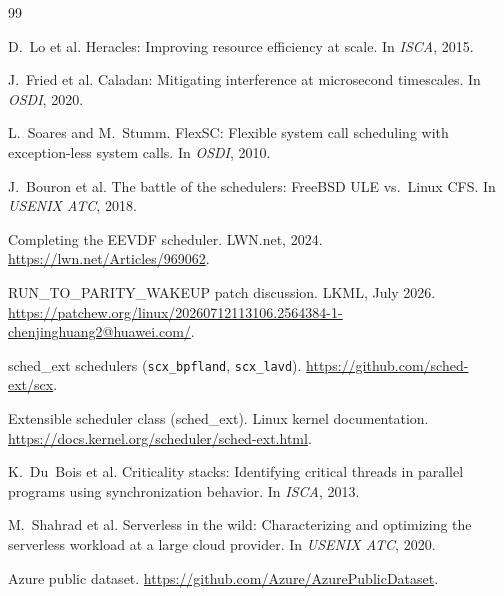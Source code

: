 \documentclass[letterpaper,twocolumn,10pt]{article}
\begin{document}
{\footnotesize
\begin{thebibliography}{99}
\setlength{\itemsep}{0pt}

D.~Lo et al.
\newblock Heracles: Improving resource efficiency at scale.
\newblock In {\em ISCA}, 2015.

J.~Fried et al.
\newblock Caladan: Mitigating interference at microsecond timescales.
\newblock In {\em OSDI}, 2020.

L.~Soares and M.~Stumm.
\newblock FlexSC: Flexible system call scheduling with exception-less system
  calls.
\newblock In {\em OSDI}, 2010.

J.~Bouron et al.
\newblock The battle of the schedulers: FreeBSD ULE vs.\ Linux CFS.
\newblock In {\em USENIX ATC}, 2018.

Completing the EEVDF scheduler.
\newblock LWN.net, 2024. \url{https://lwn.net/Articles/969062}.

RUN\_TO\_PARITY\_WAKEUP patch discussion.
\newblock LKML, July 2026.
\newblock
  \url{https://patchew.org/linux/20260712113106.2564384-1-chenjinghuang2@huawei.com/}.

sched\_ext schedulers (\texttt{scx\_bpfland}, \texttt{scx\_lavd}).
\newblock \url{https://github.com/sched-ext/scx}.

Extensible scheduler class (sched\_ext).
\newblock Linux kernel documentation.
\newblock \url{https://docs.kernel.org/scheduler/sched-ext.html}.

K.~Du~Bois et al.
\newblock Criticality stacks: Identifying critical threads in parallel
  programs using synchronization behavior.
\newblock In {\em ISCA}, 2013.

M.~Shahrad et al.
\newblock Serverless in the wild: Characterizing and optimizing the serverless
  workload at a large cloud provider.
\newblock In {\em USENIX ATC}, 2020.

Azure public dataset.
\newblock \url{https://github.com/Azure/AzurePublicDataset}.

\end{thebibliography}
}
\end{document}
